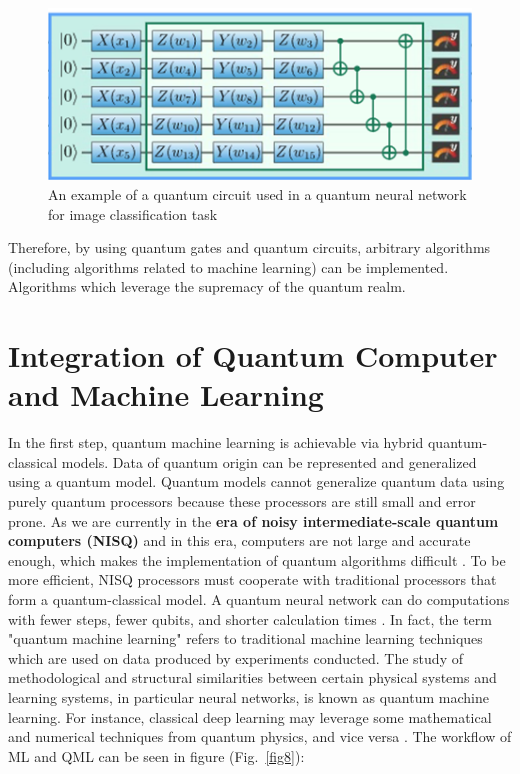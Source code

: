 \documentclass[conference]{IEEEtran}
\begin{document}
\begin{figure}[htbp]
	\centerline{\includegraphics[scale=0.9]{qc.png}}
	\caption{An example of a quantum circuit used in a quantum neural network for image classification task \cite{b17}}
	\label{fig7}
\end{figure}

Therefore, by using quantum gates and quantum circuits, arbitrary algorithms (including algorithms related to machine learning) can be implemented. Algorithms which leverage the supremacy of the quantum realm.

\section{Integration of Quantum Computer and Machine Learning}
In the first step, quantum machine learning is achievable via hybrid quantum-classical models. Data of quantum origin can be represented and generalized using a quantum model. Quantum models cannot generalize quantum data using purely quantum processors because these processors are still small and error prone. As we are currently in the \textbf{era of noisy intermediate-scale quantum computers (NISQ)} and in this era, computers are not large and accurate enough, which makes the implementation of quantum algorithms difficult \cite{b31}. To be more efficient, NISQ processors must cooperate with traditional processors that form a quantum-classical model. A quantum neural network can do computations with fewer steps, fewer qubits, and shorter calculation times \cite{b5}. In fact, the term "quantum machine learning" refers to traditional machine learning techniques which are used on data produced by experiments conducted. The study of methodological and structural similarities between certain physical systems and learning systems, in particular neural networks, is known as quantum machine learning. For instance, classical deep learning may leverage some mathematical and numerical techniques from quantum physics, and vice versa \cite{b5}. The workflow of ML and QML can be seen in figure (Fig.~\ref{fig8}):
\end{document}
